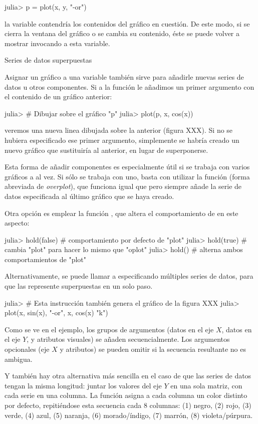 ﻿\documentclass[spanish]{article}
\begin{document}
julia> p = plot(x, y, "-or")

la variable  contendría los contenidos del gráfico en cuestión. 
De este modo, si se cierra la ventana del gráfico o se cambia su contenido,
éste se puede volver a mostrar invocando a esta variable.


Series de datos superpuestas

Asignar un gráfico a una variable también sirve para añadirle nuevas
series de datos u otros componentes. Si a la función  le añadimos un
primer argumento con el contenido de un gráfico anterior:

julia> # Dibujar sobre el gráfico "p"
julia> plot(p, x, cos(x))

veremos una nueva linea dibujada sobre la anterior (figura XXX). Si no se
hubiera especificado ese primer argumento, simplemente se habría creado
un nuevo gráfico que sustituiría al anterior, en lugar de superponerse.

Esta forma de añadir componentes es especialmente útil si se trabaja
con varios gráficos a al vez. Si sólo se trabaja con uno, basta con utilizar la
función  (forma abreviada de \emph{overplot}), que funciona igual
que  pero siempre añade la serie de datos especificada al
último gráfico que se haya creado.

Otra opción es emplear la función ,
que altera el comportamiento de  en este aspecto:

julia> hold(false) # comportamiento por defecto de "plot"
julia> hold(true)  # cambia "plot" para hacer lo mismo que "oplot"
julia> hold()      # alterna ambos comportamientos de "plot"

Alternativamente, se puede llamar a  especificando múltiples
series de datos, para que las represente superpuestas en un solo paso.

julia> # Esta instrucción también genera el gráfico de la figura XXX
julia> plot(x, sin(x), "-or", x, cos(x) "k")

Como se ve en el ejemplo, los grupos de argumentos (datos en el eje $X$,
datos en el eje $Y$, y atributos visuales) se añaden secuencialmente. Los
argumentos opcionales (eje $X$ y atributos) se pueden omitir si la
secuencia resultante no es ambigua.

Y también hay otra alternativa más sencilla en el caso de que las series
de datos tengan la misma longitud: juntar los valores del eje $Y$ en una
sola matriz, con cada serie en una columna. La función 
asigna a cada columna un color distinto por defecto, repitiéndose esta
secuencia cada 8 columnas: (1) negro, (2) rojo, (3) verde, (4) azul,
(5) naranja, (6) morado/índigo, (7) marrón, (8) violeta/púrpura.
\end{document}
